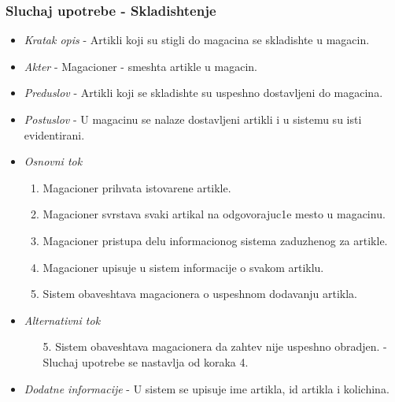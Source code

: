 \documentclass[10 pt]{article}
\begin{document}
	\subsubsection{Sluchaj upotrebe - Skladishtenje}
		
		\begin{itemize}
			\item\textit{Kratak opis} - Artikli koji su stigli do magacina se skladishte u magacin.
			
			\item\textit{Akter} - Magacioner - smeshta artikle u magacin.

			
			\item\textit{Preduslov} - Artikli koji se skladishte su uspeshno dostavljeni do magacina.

			
			\item\textit{Postuslov} - U magacinu se nalaze dostavljeni artikli i u sistemu su isti evidentirani.

			
			\item\textit{Osnovni tok}
				\begin{enumerate}
					\item Magacioner prihvata istovarene artikle.

					\item Magacioner svrstava svaki artikal na odgovorajuc1e mesto u magacinu.

					\item Magacioner pristupa delu informacionog sistema zaduzhenog za artikle.

					\item Magacioner upisuje u sistem informacije o svakom artiklu.

					\item Sistem obaveshtava magacionera o uspeshnom dodavanju artikla.

				\end{enumerate} 

		
			\item\textit{Alternativni tok}
				\begin{enumerate}
					\item [5.] Sistem obaveshtava magacionera da zahtev nije uspeshno obradjen.
- Sluchaj upotrebe se nastavlja od koraka 4.

				\end{enumerate}
			
			\item\textit{Dodatne informacije} - U sistem se upisuje ime artikla, id artikla i kolichina.

			
		\end{itemize}
	
\end{document}
